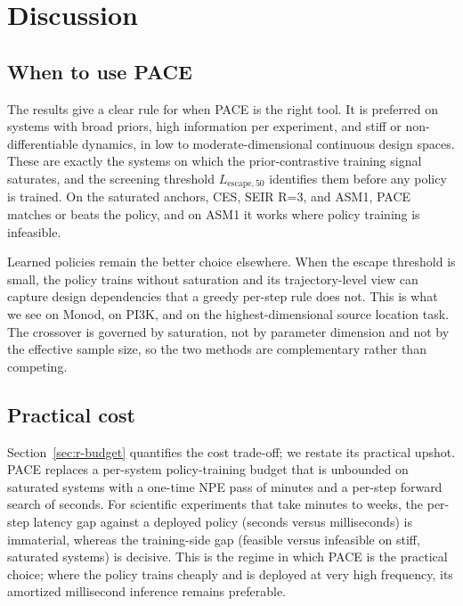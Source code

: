 \chapter{Discussion}
\label{sec:discussion}

\section{When to use PACE}
\label{sec:d-when}

The results give a clear rule for when PACE is the right tool. It is preferred on
systems with broad priors, high information per experiment, and stiff or
non-differentiable dynamics, in low to moderate-dimensional continuous design
spaces. These are exactly the systems on which the prior-contrastive training
signal saturates, and the screening threshold $L_{\mathrm{escape},50}$ identifies
them before any policy is trained. On the saturated anchors, CES, SEIR R=3, and
ASM1, PACE matches or beats the policy, and on ASM1 it works where policy training
is infeasible.

Learned policies remain the better choice elsewhere. When the escape threshold is
small, the policy trains without saturation and its trajectory-level view can
capture design dependencies that a greedy per-step rule does not. This is what we
see on Monod, on PI3K, and on the highest-dimensional source location task. The
crossover is governed by saturation, not by parameter dimension and not by the
effective sample size, so the two methods are complementary rather than competing.

\section{Practical cost}
\label{sec:d-cost}

Section~\ref{sec:r-budget} quantifies the cost trade-off; we restate its practical
upshot. PACE replaces a per-system policy-training budget that is unbounded on saturated
systems with a one-time NPE pass of minutes and a per-step forward search of seconds. For
scientific experiments that take minutes to weeks, the per-step latency gap against a
deployed policy (seconds versus milliseconds) is immaterial, whereas the training-side
gap (feasible versus infeasible on stiff, saturated systems) is decisive. This is the
regime in which PACE is the practical choice; where the policy trains cheaply and is
deployed at very high frequency, its amortized millisecond inference remains preferable.

